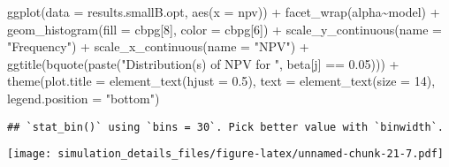 \documentclass[
]{article}
\newenvironment{Shaded}{\begin{snugshade}}{\end{snugshade}}
\newcommand{\AttributeTok}[1]{\textcolor[rgb]{0.77,0.63,0.00}{#1}}
\newcommand{\DecValTok}[1]{\textcolor[rgb]{0.00,0.00,0.81}{#1}}
\newcommand{\FloatTok}[1]{\textcolor[rgb]{0.00,0.00,0.81}{#1}}
\newcommand{\FunctionTok}[1]{\textcolor[rgb]{0.00,0.00,0.00}{#1}}
\newcommand{\NormalTok}[1]{#1}
\newcommand{\SpecialCharTok}[1]{\textcolor[rgb]{0.00,0.00,0.00}{#1}}
\newcommand{\StringTok}[1]{\textcolor[rgb]{0.31,0.60,0.02}{#1}}
\begin{document}
\begin{Shaded}
\begin{Highlighting}[]
\FunctionTok{ggplot}\NormalTok{(}\AttributeTok{data =}\NormalTok{ results.smallB.opt,}
       \FunctionTok{aes}\NormalTok{(}\AttributeTok{x =}\NormalTok{ npv)) }\SpecialCharTok{+}
  \FunctionTok{facet\_wrap}\NormalTok{(alpha}\SpecialCharTok{\textasciitilde{}}\NormalTok{model) }\SpecialCharTok{+}
  \FunctionTok{geom\_histogram}\NormalTok{(}\AttributeTok{fill =}\NormalTok{ cbpg[}\DecValTok{8}\NormalTok{], }\AttributeTok{color =}\NormalTok{ cbpg[}\DecValTok{6}\NormalTok{]) }\SpecialCharTok{+}
  \FunctionTok{scale\_y\_continuous}\NormalTok{(}\AttributeTok{name =} \StringTok{"Frequency"}\NormalTok{) }\SpecialCharTok{+}
  \FunctionTok{scale\_x\_continuous}\NormalTok{(}\AttributeTok{name =} \StringTok{"NPV"}\NormalTok{) }\SpecialCharTok{+}
  \FunctionTok{ggtitle}\NormalTok{(}\FunctionTok{bquote}\NormalTok{(}\FunctionTok{paste}\NormalTok{(}\StringTok{"Distribution(s) of NPV for "}\NormalTok{, beta[j] }\SpecialCharTok{==} \FloatTok{0.05}\NormalTok{))) }\SpecialCharTok{+}
  \FunctionTok{theme}\NormalTok{(}\AttributeTok{plot.title =} \FunctionTok{element\_text}\NormalTok{(}\AttributeTok{hjust =} \FloatTok{0.5}\NormalTok{), }
        \AttributeTok{text =} \FunctionTok{element\_text}\NormalTok{(}\AttributeTok{size =} \DecValTok{14}\NormalTok{),}
        \AttributeTok{legend.position =} \StringTok{"bottom"}\NormalTok{)}
\end{Highlighting}
\end{Shaded}

\begin{verbatim}
## `stat_bin()` using `bins = 30`. Pick better value with `binwidth`.
\end{verbatim}

\texttt{[image: simulation\_details\_files/figure-latex/unnamed-chunk-21-7.pdf]}
\end{document}
